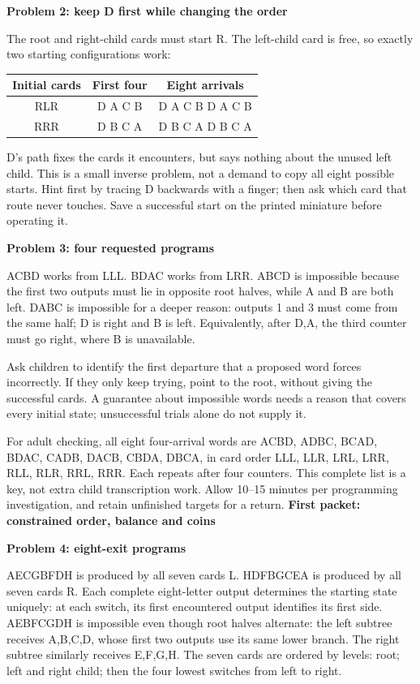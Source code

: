 \documentclass[11pt]{article}
\newcommand{\head}[1]{\vspace{3pt}\textbf{\large #1}\par}
\newcommand{\prob}[1]{\vspace{3pt}\textbf{#1}\par}
\begin{document}
\prob{Problem 2: keep D first while changing the order}
The root and right-child cards must start R. The left-child card is free, so exactly two starting configurations work:
\begin{center}
\begin{tabular}{ccc}\toprule
Initial cards & First four & Eight arrivals\\\midrule
RLR & D A C B & D A C B D A C B\\
RRR & D B C A & D B C A D B C A\\\bottomrule
\end{tabular}
\end{center}
D's path fixes the cards it encounters, but says nothing about the unused left child. This is a small inverse problem, not a demand to copy all eight possible starts. Hint first by tracing D backwards with a finger; then ask which card that route never touches. Save a successful start on the printed miniature before operating it.

\prob{Problem 3: four requested programs}
ACBD works from LLL. BDAC works from LRR. ABCD is impossible because the first two outputs must lie in opposite root halves, while A and B are both left. DABC is impossible for a deeper reason: outputs 1 and 3 must come from the same half; D is right and B is left. Equivalently, after D,A, the third counter must go right, where B is unavailable.

Ask children to identify the first departure that a proposed word forces incorrectly. If they only keep trying, point to the root, without giving the successful cards. A guarantee about impossible words needs a reason that covers every initial state; unsuccessful trials alone do not supply it.

For adult checking, all eight four-arrival words are ACBD, ADBC, BCAD, BDAC, CADB, DACB, CBDA, DBCA, in card order LLL, LLR, LRL, LRR, RLL, RLR, RRL, RRR. Each repeats after four counters. This complete list is a key, not extra child transcription work. Allow 10--15 minutes per programming investigation, and retain unfinished targets for a return.
\newpage
\head{First packet: constrained order, balance and coins}
\prob{Problem 4: eight-exit programs}
AECGBFDH is produced by all seven cards L. HDFBGCEA is produced by all seven cards R. Each complete eight-letter output determines the starting state uniquely: at each switch, its first encountered output identifies its first side. AEBFCGDH is impossible even though root halves alternate: the left subtree receives A,B,C,D, whose first two outputs use its same lower branch. The right subtree similarly receives E,F,G,H. The seven cards are ordered by levels: root; left and right child; then the four lowest switches from left to right.
\end{document}
